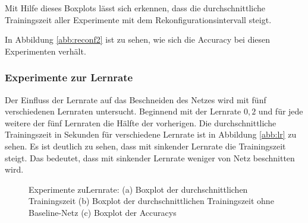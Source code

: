  Mit Hilfe dieses Boxplots lässt sich erkennen, dass die durchschnittliche Trainingszeit aller Experimente mit dem Rekonfigurationsintervall steigt.
 
 In Abbildung \ref{abb:reconf2} ist zu sehen, wie sich die Accuracy bei diesen Experimenten verhält.
 
\subsubsection{Experimente zur Lernrate}
Der Einfluss der Lernrate auf das Beschneiden des Netzes wird mit fünf verschiedenen Lernraten untersucht. Beginnend mit der Lernrate $0,2$ und für jede weitere der fünf Lernraten die Hälfte der vorherigen.
Die durchschnittliche Trainingszeit in Sekunden für verschiedene Lernrate ist in Abbildung \ref{abb:lr} zu sehen. Es ist deutlich zu sehen, dass mit sinkender Lernrate die Trainingszeit steigt. Das bedeutet, dass mit sinkender Lernrate weniger von Netz beschnitten wird.
 
 \begin{figure}
     \centering
     \hfill
     \caption{Experimente zuLernrate: (a) Boxplot der durchschnittlichen Trainingszeit (b) Boxplot der durchschnittlichen Trainingszeit ohne Baseline-Netz (c) Boxplot der Accuracys}
     \label{abb:reconf}
\end{figure}

